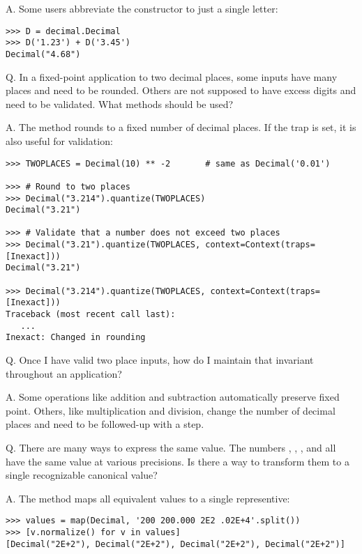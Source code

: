 A.  Some users abbreviate the constructor to just a single letter:

\begin{verbatim}
>>> D = decimal.Decimal
>>> D('1.23') + D('3.45')
Decimal("4.68")
\end{verbatim}


Q.  In a fixed-point application to two decimal places, some inputs
have many places and need to be rounded.  Others are not supposed to have
excess digits and need to be validated.  What methods should be used?

A.  The  method rounds to a fixed number of decimal places.
If the  trap is set, it is also useful for validation:

\begin{verbatim}
>>> TWOPLACES = Decimal(10) ** -2       # same as Decimal('0.01')

>>> # Round to two places
>>> Decimal("3.214").quantize(TWOPLACES)
Decimal("3.21")

>>> # Validate that a number does not exceed two places 
>>> Decimal("3.21").quantize(TWOPLACES, context=Context(traps=[Inexact]))
Decimal("3.21")

>>> Decimal("3.214").quantize(TWOPLACES, context=Context(traps=[Inexact]))
Traceback (most recent call last):
   ...
Inexact: Changed in rounding
\end{verbatim}


Q.  Once I have valid two place inputs, how do I maintain that invariant
throughout an application?

A.  Some operations like addition and subtraction automatically preserve fixed
point.  Others, like multiplication and division, change the number of decimal
places and need to be followed-up with a  step.


Q.  There are many ways to express the same value.  The numbers
, , , and  all
have the same value at various precisions. Is there a way to transform them to
a single recognizable canonical value?

A.  The  method maps all equivalent values to a single
representive:

\begin{verbatim}
>>> values = map(Decimal, '200 200.000 2E2 .02E+4'.split())
>>> [v.normalize() for v in values]
[Decimal("2E+2"), Decimal("2E+2"), Decimal("2E+2"), Decimal("2E+2")]
\end{verbatim}


